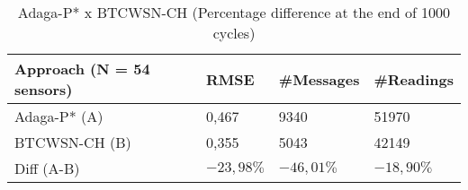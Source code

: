 \documentclass[conference]{IEEEtran}
\begin{document}
\begin{table}[h!]
\caption{Adaga-P* x BTCWSN-CH (Percentage difference at the end of 1000 cycles)}
\begin{center}
\begin{tabular}{|l||l|l|l|}
\hline
Approach (N = 54 sensors) &RMSE &\#Messages &\#Readings \\
\hline\hline
Adaga-P* (A) &0,467 &9340 &51970 \\
\hline
BTCWSN-CH (B) &0,355 &5043 &42149 \\
\hline
Diff (A-B) &$-23,98\%$ &$-46,01\%$ &$-18,90\%$ \\
\hline
\end{tabular}
\end{center}
\end{table}

%
%



%
%
\end{document}

